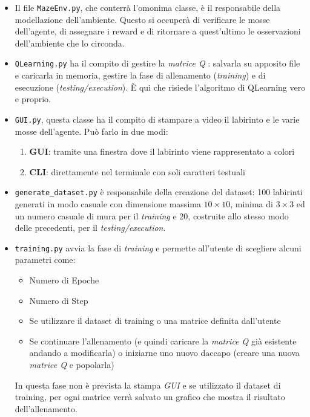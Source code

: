 \begin{itemize}
	\item Il file \lstinline[style=cmd]|MazeEnv.py|, che conterr\`{a} l'omonima classe, \`{e} il responsabile della modellazione dell'ambiente. Questo si occuper\`{a}  di verificare le mosse dell'agente, di assegnare i reward e di ritornare a quest'ultimo le osservazioni dell'ambiente che lo circonda.
	\item \lstinline[style=cmd]|QLearning.py| ha il compito di gestire la \textit{matrice Q }: salvarla su apposito file e caricarla in memoria, gestire la fase di allenamento (\textit{training}) e di esecuzione (\textit{testing/execution}). \`{E} qui che risiede l'algoritmo di QLearning vero e proprio.
	\item \lstinline[style=cmd]|GUI.py|, questa classe ha il compito di stampare a video il labirinto e le varie mosse dell'agente. Pu\`{o} farlo in due modi: 
	\begin{enumerate}
		\item \textbf{GUI}: tramite una finestra dove il labirinto viene rappresentato a colori
		\item  \textbf{CLI}: direttamente nel terminale con soli caratteri testuali
	\end{enumerate}
	\item \lstinline[style=cmd]|generate_dataset.py| \`{e} responsabile della creazione del dataset: 100 labirinti generati in modo casuale con dimensione massima $10 \times 10$, minima di $3 \times 3$ ed un numero casuale di mura per il \textit{training} e 20, costruite allo stesso modo delle precedenti, per il \textit{testing/execution}.
	\item \lstinline[style=cmd]|training.py| avvia la fase di \textit{training} e permette all'utente di scegliere alcuni parametri come:
	\begin{itemize}
		\item Numero di Epoche
		\item Numero di Step
		\item Se utilizzare il dataset di training o una matrice definita dall'utente
		\item Se continuare l'allenamento (e quindi caricare la \textit{matrice Q} gi\`{a} esistente andando a modificarla) o iniziarne uno nuovo daccapo (creare una nuova \textit{matrice Q} e popolarla)
	\end{itemize}
	In questa fase non \`{e} prevista la stampa \textit{GUI} e se utilizzato il dataset di training, per ogni matrice verr\`{a} salvato un grafico che mostra il risultato dell'allenamento.

\end{itemize}
